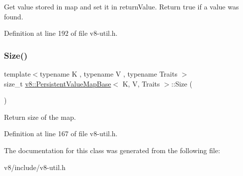 Get value stored in map and set it in return\+Value. Return true if a value was found. 

Definition at line 192 of file v8-\/util.\+h.

\mbox{\label{classv8_1_1PersistentValueMapBase_ade5c5db2a968fdabe073649e85b837eb}} 
\subsubsection{\texorpdfstring{Size()}{Size()}}
{\footnotesize\ttfamily template$<$typename K , typename V , typename Traits $>$ \\
size\+\_\+t \mbox{\hyperlink{classv8_1_1PersistentValueMapBase}{v8\+::\+Persistent\+Value\+Map\+Base}}$<$ K, V, Traits $>$\+::Size (\begin{DoxyParamCaption}{ }\end{DoxyParamCaption})\hspace{0.3cm}{\ttfamily [inline]}}

Return size of the map. 

Definition at line 167 of file v8-\/util.\+h.



The documentation for this class was generated from the following file\+:\begin{DoxyCompactItemize}
\item 
v8/include/v8-\/util.\+h\end{DoxyCompactItemize}
